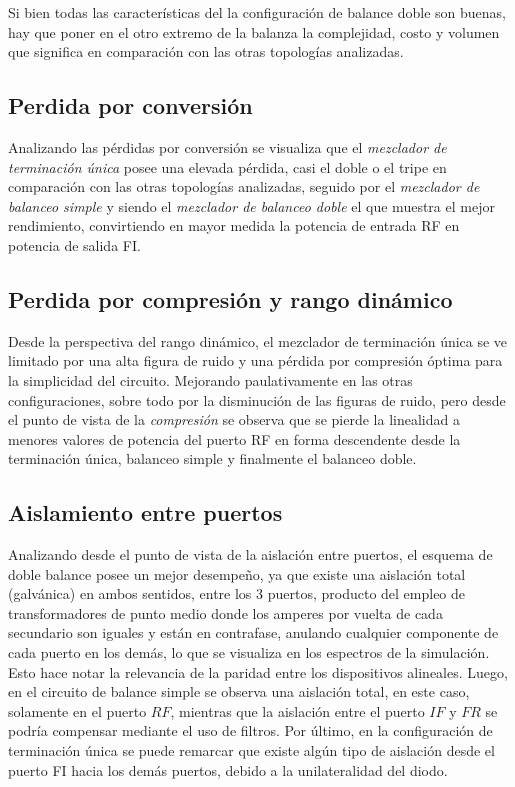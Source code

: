 \documentclass[twocolumn]{article}
\begin{document}
 Si bien todas las características del la configuración de balance doble son buenas, hay que poner en el otro extremo de la balanza la complejidad, costo y volumen que significa en comparación con las otras topologías analizadas.

\subsection{Perdida por conversión}
Analizando las pérdidas por conversión se visualiza que el \textit{mezclador de terminación única} posee una elevada pérdida, casi el doble o el tripe en comparación con las otras topologías analizadas, seguido por el \textit{mezclador de balanceo simple} y siendo el \textit{mezclador de balanceo doble} el que muestra el mejor rendimiento, convirtiendo en mayor medida la potencia de entrada RF en potencia de salida FI.

\subsection{Perdida por compresión y rango dinámico}
Desde la perspectiva del rango dinámico, el mezclador de terminación única se ve limitado por una alta figura de ruido y una pérdida por compresión óptima para la simplicidad del circuito. Mejorando paulativamente en las otras configuraciones, sobre todo por la disminución de las figuras de ruido, pero desde el punto de vista de la \textit{compresión} se observa que se pierde la linealidad a menores valores de potencia del puerto RF en forma descendente desde la terminación única, balanceo simple y finalmente el balanceo doble.

\subsection{Aislamiento entre puertos}
Analizando desde el punto de vista de la aislación entre puertos, el esquema de doble balance posee un mejor desempeño, ya que existe una aislación total (galvánica) en ambos sentidos, entre los 3 puertos, producto del empleo de transformadores de punto medio donde los amperes por vuelta de cada secundario son iguales y están en contrafase, anulando cualquier componente de cada puerto en los demás, lo que se visualiza en los espectros de la simulación. Esto hace notar la relevancia de la paridad entre los dispositivos alineales. Luego, en el circuito de balance simple se observa una aislación total, en este caso, solamente en el puerto $RF$, mientras que la aislación entre el puerto $IF$ y $FR$ se podría compensar mediante el uso de filtros. Por último, en la configuración de terminación única se puede remarcar que existe algún tipo de aislación desde el puerto FI hacia los demás puertos, debido a la unilateralidad del diodo.
\end{document}
